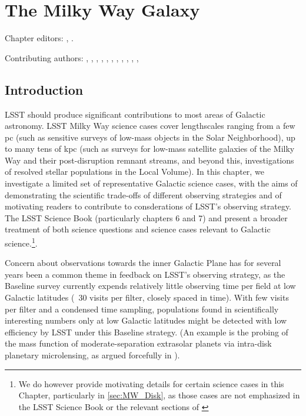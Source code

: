 
\chapter[The Milky Way Galaxy]{The Milky Way Galaxy}
\def\chpname{galaxy}\label{chp:\chpname}

Chapter editors:
,
.

Contributing authors:
,
,
,
,
,
,
,
,
,
,
,



\section{Introduction}
\def\secname{MW_Intro}\label{sec:\secname}

LSST should produce significant contributions to most areas
of Galactic astronomy. LSST Milky Way science cases cover lengthscales
ranging from a few pc (such as sensitive surveys of low-mass objects in
the Solar Neighborhood), up to many tens of kpc (such as surveys for
low-mass satellite galaxies of the Milky Way and their post-disruption
remnant streams, and beyond this, investigations of resolved stellar
populations in the Local Volume). In this chapter, we investigate a limited set of representative Galactic science cases, with the aims of demonstrating the scientific trade-offs of different observing strategies and of motivating readers to contribute to consderations of LSST's observing strategy.  The LSST Science Book
(particularly chapters 6 and 7) and \citet[][in particular Sections
2.1.4 and 4.4]{IvezicEtal2008} present a broader treatment of both science questions and science cases relevant to Galactic science.\footnote{We do however provide
motivating details for certain science cases in this Chapter,
particularly in \autoref{sec:MW_Disk}, as those cases are not
emphasized in the LSST Science Book or the relevant sections of
\citet{IvezicEtal2008}}. 

Concern about observations towards the inner Galactic Plane has for
several years been a common theme in feedback on LSST's observing
strategy, as the Baseline survey currently expends relatively little
observing time per field at low Galactic latitudes (~30 visits per filter, closely spaced in time).  With few visits per filter and a condensed time sampling, populations found in scientifically interesting numbers only at low
Galactic latitudes might be detected with low efficiency
by LSST under this Baseline strategy. (An example is the probing of the
mass function of moderate-separation extrasolar planets via intra-disk
planetary microlensing, as argued forcefully in \citet{gould13}). 

